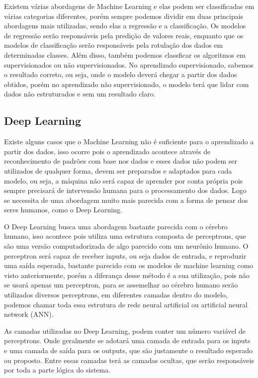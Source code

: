 
Existem várias abordagens de Machine Learning e elas podem ser classificadas em várias categorias diferentes, porém sempre podemos dividir em duas principais abordagens mais utilizadas, sendo elas a regressão e a classificação. Os modelos de regressão serão responsáveis pela predição de valores reais, enquanto que os modelos de classificação serão responsáveis pela rotulação dos dados em determinadas classes. Além disso, também podemos classficar os algoritmos em supervisionados ou não supervisionados. No aprendizado supervisionado, sabemos o resultado correto, ou seja, onde o modelo deverá chegar a partir dos dados obtidos, porém no aprendizado não supervisionado, o modelo terá que lidar com dados não estruturados e sem um resultado claro. %

\subsection{Deep Learning}
Existe alguns casos que o Machine Learning não é suficiente para o aprendizado a partir dos dados, isso ocorre pois o aprendizado acontece através de reconhecimento de padrões com base nos dados e esses dados não podem ser utilizados de qualquer forma, devem ser preparados e adaptados para cada modelo, ou seja, a máquina não será capaz de aprender por conta própria pois sempre precisará de intervensão humana para o processamento dos dados. Logo se necessita de uma abordagem muito mais parecida com a forma de pensar dos seres humanos, como o Deep Learning. %

O Deep Learning busca uma abordagem bastante parecida com o cérebro humano, isso acontece pois utiliza uma estrutura composta de perceptrons, que são uma versão computadorizada de algo parecido com um neurônio humano. O perceptron será capaz de receber inputs, ou seja dados de entrada, e reproduzir uma saída esperada, bastante parecido com os modelos de machine learning como visto anteriormente, porém a diferança desse método é a sua utilização, pois não se usará apenas um perceptron, para se assemelhar ao cérebro humano serão utilizados diversos perceptrons, em diferentes camadas dentro do modelo, podemos chamar toda essa estrutura de rede neural artificial ou artificial neural network (ANN). %

As camadas utilizadas no Deep Learning, podem conter um número variável de perceptrons. Onde geralmente se adotará uma camada de entrada para os inputs e uma camada de saída para os outputs, que são justamente o resultado esperado ou proposto. Entre essas camadas terá as camadas ocultas, que serão responsáveis por toda a parte lógica do sistema. %

